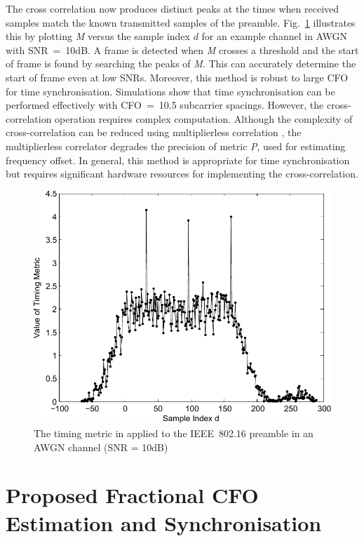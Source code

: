 The cross correlation now produces distinct peaks at the times when received samples match the known transmitted samples of the preamble. Fig.~\ref{fig:M2-10dB} illustrates this by plotting \emph{M} versus the sample index $d$ for an example channel in AWGN with SNR~=~10{\thinspace}dB. 
A frame is detected when \emph{M} crosses a threshold and the start of frame is found by searching the peaks of \emph{M}. 
This can accurately determine the start of frame even at low SNRs. 
Moreover, this method is robust to large CFO for time synchronisation. 
Simulations \cite{Kishore2006} show that time synchronisation can be performed effectively with CFO~=~10.5 subcarrier spacings.
However, the cross-correlation operation requires complex computation. 
Although the complexity of cross-correlation can be reduced using multiplierless correlation \cite{Yip2003}, the multiplierless correlator degrades the precision of metric \emph{P}, used for estimating frequency offset.
In general, this method is appropriate for time synchronisation but requires significant hardware resources for implementing the cross-correlation.

\begin{figure}
	\centerline{\includegraphics [width=0.8\columnwidth] {figures/M2_10dB.pdf} }
	\caption{The timing metric in \cite{Kishore2006} applied to the IEEE~802.16 preamble in an AWGN channel (SNR = 10dB)}
	\label{fig:M2-10dB}
\end{figure}

\section{Proposed Fractional CFO Estimation and Synchronisation}

